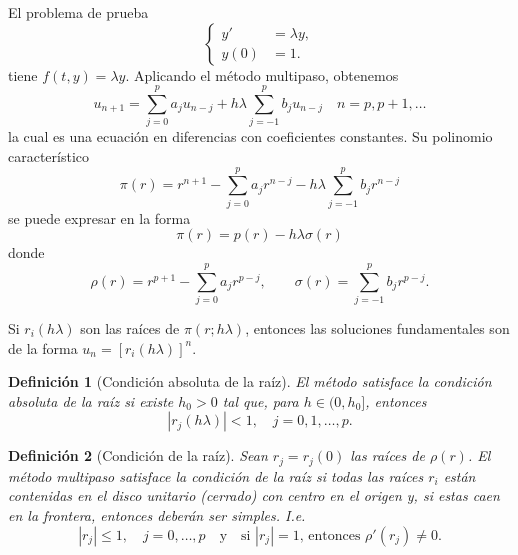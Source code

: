 \documentclass[11pt,letterpaper]{report}
\newtheorem{definition}{Definición}
\begin{document}
El problema de prueba
\begin{equation}
  \left\{
    \begin{aligned}
      y' &= \lambda y, \\
      y(0) &= 1.
    \end{aligned}
  \right.
\end{equation}
tiene $f(t,y)=\lambda y$. Aplicando el método multipaso, obtenemos
\begin{equation}
  u_{n+1}
  =
  \sum_{j=0}^{p}a_ju_{n-j}
  +
  h\lambda
  \sum_{j=-1}^{p}b_ju_{n-j}
  \quad
  n=p, p+1,\dots
\end{equation}
la cual es una ecuación en diferencias con coeficientes constantes.
Su polinomio característico
\begin{equation}
  \pi(r)
  = 
  r^{n+1}
  -
  \sum_{j=0}^{p}a_jr^{n-j}
  -
  h\lambda
  \sum_{j=-1}^{p}b_jr^{n-j}
\end{equation}
se puede expresar en la forma
\begin{equation}
  \pi(r) = p(r) - h\lambda\sigma(r)
\end{equation}
donde
\begin{equation}
  \rho(r)
  =
  r^{p+1}
  -
  \sum_{j=0}^{p}a_jr^{p-j},
  \qquad
  \sigma(r)
  =
  \sum_{j=-1}^{p}b_jr^{p-j}
.\end{equation}

Si $r_i(h\lambda)$ son las raíces de $\pi(r;h\lambda)$, entonces las
soluciones fundamentales son de la forma $u_n = [r_i(h\lambda)]^n$.

\begin{definition}[Condición absoluta de la raíz]
  El método satisface la \emph{condición absoluta de la raíz} si
  existe $h_0>0$ tal que, para $h\in (0,h_0]$, entonces
  \begin{equation}
    |r_j(h\lambda)|<1, \quad j=0,1,\dots,p
  .\end{equation}
\end{definition}

\begin{definition}[Condición de la raíz]
  Sean $r_j=r_j(0)$ las raíces de $\rho(r)$.
  El método multipaso satisface la \emph{condición de la raíz} si
  todas las
  raíces $r_i$ están contenidas en el disco unitario (cerrado) con
  centro en el origen y, si estas caen en la frontera, entonces
  deberán ser simples. I.e.
  \begin{equation}
    |r_j|\leq 1, \quad j=0,\dots,p
    \quad \text{y} \quad
    \text{si $|r_j|=1$, entonces } \rho'(r_j)\neq 0
  .\end{equation}
\end{definition}
\end{document}
